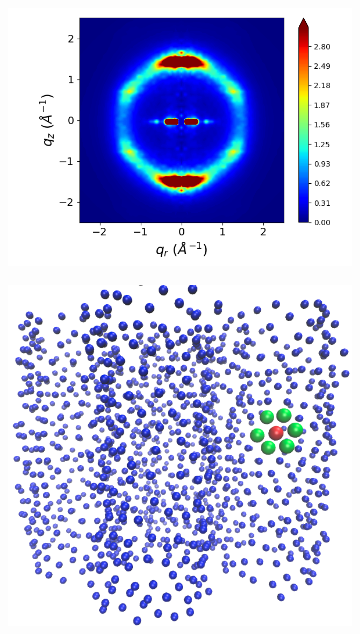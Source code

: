 \documentclass[journal=jpcbfk,manuscript=article]{achemso}
\begin{document}
\begin{figure}[!htb]
\begin{subfigure}{0.32\linewidth}
	\includegraphics[width=\textwidth]{tails_rzplot_jet.png}
	\caption{}\label{fig:tails_rzplot}
  \end{subfigure}
  \begin{subfigure}[t]{0.32\linewidth}
    \centering
	\includegraphics[scale=0.2]{centroids.png}
  \caption{}\label{fig:centroids}
  \end{subfigure}
  \begin{subfigure}[t]{0.32\linewidth}
        \centering

\end{subfigure}
\end{figure}
\end{document}
